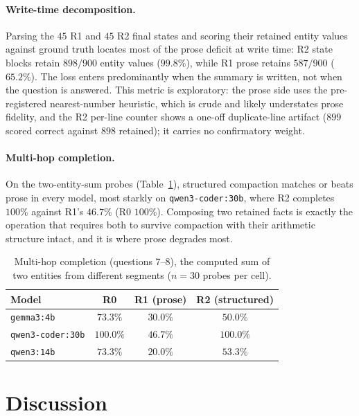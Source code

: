 \documentclass[11pt]{article}
\begin{document}
\paragraph{Write-time decomposition.}
Parsing the $45$ R1 and $45$ R2 final states and scoring their retained entity
values against ground truth locates most of the prose deficit at write time:
R2 state blocks retain $898/900$ entity values ($99.8\%$), while R1 prose
retains $587/900$ ($65.2\%$). The loss enters predominantly when the summary
is written, not when the question is answered. This metric is exploratory: the
prose side uses the pre-registered nearest-number heuristic, which is crude
and likely understates prose fidelity, and the R2 per-line counter shows a
one-off duplicate-line artifact ($899$ scored correct against $898$ retained);
it carries no confirmatory weight.

\paragraph{Multi-hop completion.}
On the two-entity-sum probes (Table~\ref{tab:multihop}), structured
compaction matches or beats prose in every model, most starkly on
\texttt{qwen3-coder:30b}, where R2 completes $100\%$ against R1's $46.7\%$ (R0
$100\%$). Composing two retained facts is exactly the operation that requires
both to survive compaction with their arithmetic structure intact, and it is
where prose degrades most.

\begin{table}[ht]
\centering
\caption{Multi-hop completion (questions 7--8), the computed sum of two
entities from different segments ($n=30$ probes per cell).}
\label{tab:multihop}
\begin{tabular}{lccc}
\toprule
Model & R0 & R1 (prose) & R2 (structured) \\
\midrule
\texttt{gemma3:4b}       & $73.3\%$  & $30.0\%$ & $50.0\%$  \\
\texttt{qwen3-coder:30b} & $100.0\%$ & $46.7\%$ & $100.0\%$ \\
\texttt{qwen3:14b}       & $73.3\%$  & $20.0\%$ & $53.3\%$  \\
\bottomrule
\end{tabular}
\end{table}

\section{Discussion}
\label{sec:discussion}
\end{document}
